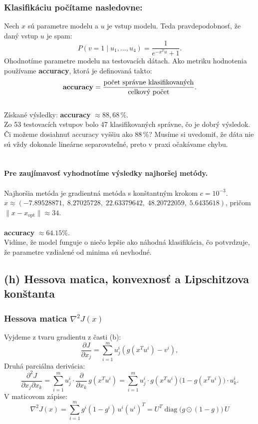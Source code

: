 \documentclass[titlepage]{article}
\begin{document}
\subsubsection*{Klasifikáciu počítame nasledovne:}
Nech $x$ sú parametre modelu a $u$ je vstup modelu. Teda pravdepodobnosť, že daný vstup $u$ je spam:
\[
P(v = 1 \mid u_1, \dots, u_4) = \frac{1}{e^{-x^T u} + 1}.
\]
Ohodnotíme parametre modelu na testovacích dátach. Ako metriku hodnotenia používame \textbf{accuracy}, ktorá je definovaná takto:\\
\[
\text{\textbf{accuracy}} = \frac{\text{počet správne klasifikovaných}}{\text{celkový počet}}.
\]
\noindent\\
Získané výsledky: \textbf{accuracy} $\approx 88{,}68\,\%$.\\
Zo 53 testovacích vstupov bolo 47 klasifikovaných správne, čo je dobrý výsledok. Či možeme dosiahnuť accuracy vyššiu ako 88\,\%? Musíme si uvedomiť, že dáta nie sú vždy dokonale lineárne separovateľné, preto v praxi očakávame chybu.
\noindent\\
\noindent\\
\noindent\\
\textbf{Pre zaujímavosť vyhodnotíme výsledky najhoršej metódy.}\\
\noindent\\
Najhoršia metóda je gradientná metóda s konštantným krokom $c = 10^{-3}$.\\
$x \approx (-7.89528871,\; 8.27025728,\; 22.63379642,\; 48.20722059,\; 5.6435618)$, pričom $\|x - x_{\text{opt}}\| \approx 34$.\\
\noindent\\
\textbf{accuracy} $\approx 64.15\%$.\\
Vidíme, že model funguje o niečo lepšie ako náhodná klasifikácia, čo potvrdzuje, že parametre vzdialené od minima sú nevhodné.

\subsection*{(h) Hessova matica, konvexnosť a Lipschitzova konštanta}

\subsubsection*{Hessova matica $\nabla^2 J(x)$}

Vyjdeme z tvaru gradientu z časti (b):
\[
\frac{\partial J}{\partial x_j} = \sum_{i=1}^{m} u_j^i \left(g(x^T u^i) - v^i\right),
\]
Druhá parciálna derivácia:
\[
\frac{\partial^2 J}{\partial x_j \partial x_k}
= \sum_{i=1}^{m} u_j^i \cdot \frac{\partial}{\partial x_k}\, g(x^T u^i)
= \sum_{i=1}^{m} u_j^i \cdot g(x^T u^i)\bigl(1 - g(x^T u^i)\bigr) \cdot u_k^i.
\]
V maticovom zápise:
\[
\nabla^2 J(x) = \sum_{i=1}^{m} g^i(1-g^i)\, u^i (u^i)^T = U^T \operatorname{diag}\!\bigl(g \odot (1-g)\bigr)\, U
\]
\end{document}
